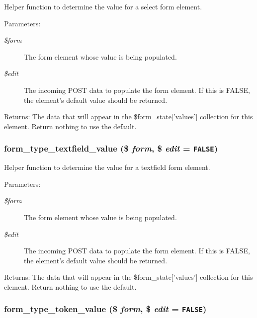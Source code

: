 Helper function to determine the value for a select form element.

\begin{Desc}
\item[Parameters:]
\begin{description}
\item[{\em \$form}]The form element whose value is being populated. \item[{\em \$edit}]The incoming POST data to populate the form element. If this is FALSE, the element's default value should be returned. \end{description}
\end{Desc}
\begin{Desc}
\item[Returns:]The data that will appear in the \$form\_\-state\mbox{[}'values'\mbox{]} collection for this element. Return nothing to use the default. \end{Desc}
\hypertarget{group__form__api_g55b3eea2f5223cb98dbcdd83cc62e432}{
\subsubsection[{form\_\-type\_\-textfield\_\-value}]{\setlength{\rightskip}{0pt plus 5cm}form\_\-type\_\-textfield\_\-value (\$ {\em form}, \/  \$ {\em edit} = {\tt FALSE})}}
\label{group__form__api_g55b3eea2f5223cb98dbcdd83cc62e432}


Helper function to determine the value for a textfield form element.

\begin{Desc}
\item[Parameters:]
\begin{description}
\item[{\em \$form}]The form element whose value is being populated. \item[{\em \$edit}]The incoming POST data to populate the form element. If this is FALSE, the element's default value should be returned. \end{description}
\end{Desc}
\begin{Desc}
\item[Returns:]The data that will appear in the \$form\_\-state\mbox{[}'values'\mbox{]} collection for this element. Return nothing to use the default. \end{Desc}
\hypertarget{group__form__api_g1bde00e0188d845783f528279775f80e}{
\subsubsection[{form\_\-type\_\-token\_\-value}]{\setlength{\rightskip}{0pt plus 5cm}form\_\-type\_\-token\_\-value (\$ {\em form}, \/  \$ {\em edit} = {\tt FALSE})}}
\label{group__form__api_g1bde00e0188d845783f528279775f80e}


